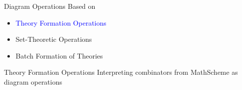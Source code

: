 \documentclass[t,12pt,numbers,fleqn,usenames,xcolor=dvipsnames]{beamer}
\begin{document}
\begin{frame}[fragile]{Diagram Operations}
Based on 
\begin{itemize}
	\item \textcolor{Blue}{Theory Formation Operations}
	\item Set-Theoretic Operations 
	\item Batch Formation of Theories 
\end{itemize}
\end{frame}
\begin{comment}[fragile]{Diagram: Examples}
\scriptsize{
	\begin{lstlisting}
diagram Semigroup := Magma extended_by {associativity : $\cdots$}
diagram CommutativeMagma := Magma extended_by {commutativity : $\cdots$}
	\end{lstlisting}}
\begin{center}
\begin{tikzcd}
	Magma \arrow[r,blue] & \textcolor{blue}{\cn{Semigroup}} \\ 
	Magma \arrow[r,blue] & \textcolor{blue}{\cn{CommutativeMagma}}	
\end{tikzcd} 
\end{center}
\scriptsize{
	\begin{lstlisting}
diagram PointedMagma := Combine Semigroup CommutativeMagma
	\end{lstlisting}}
\begin{tikzcd}
	Magma \arrow[r] \arrow[d] \arrow[rd,blue]
	& Semigroup \arrow[d]  \\
	CommutativeMagma \arrow[r] & \textcolor{blue}{\cn{CommutativeSemigroup}}
\end{tikzcd} 
\end{comment}


\begin{frame}[fragile]{Theory Formation Operations}
Interpreting combinators from MathScheme \cite{mathscheme_theoexp} as diagram operations 
\end{frame}
\end{document}

